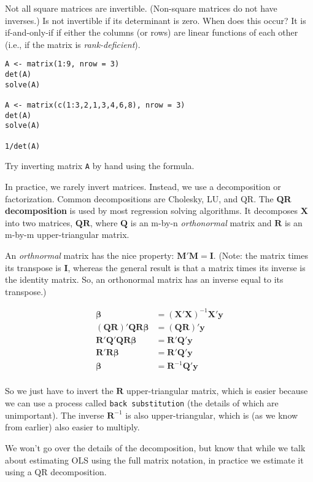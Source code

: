 \documentclass[a4paper,12pt]{article}
\newcommand{\matr}[1]{\mathbf{#1}}
\begin{document}
Not all square matrices are invertible. (Non-square matrices do not have inverses.) Is not invertible if its determinant is zero. When does this occur? It is if-and-only-if if either the columns (or rows) are linear functions of each other (i.e., if the matrix is \textit{rank-deficient}).


\begin{lstlisting}
A <- matrix(1:9, nrow = 3)
det(A)
solve(A)

A <- matrix(c(1:3,2,1,3,4,6,8), nrow = 3)
det(A)
solve(A)

1/det(A) 
\end{lstlisting}

Try inverting matrix \texttt{A} by hand using the formula.


In practice, we rarely invert matrices. Instead, we use a decomposition or factorization. Common decompositions are Cholesky, LU, and QR. The \textbf{QR decomposition} is used by most regression solving algorithms. It decomposes $\matr{X}$ into two matrices, $\matr{Q}\matr{R}$, where $\matr{Q}$ is an m-by-n \textit{orthonormal} matrix and $\matr{R}$ is an m-by-m upper-triangular matrix.

An \textit{orthnormal} matrix has the nice property: $\matr{M}'\matr{M} = \matr{I}$. (Note: the matrix times its transpose is $\matr{I}$, whereas the general result is that a matrix times its inverse is the identity matrix. So, an orthonormal matrix has an inverse equal to its transpose.)

\begin{align*}
\matr{\beta} & = (\matr{X}'\matr{X})^{-1}\matr{X}'\matr{y} \\
(\matr{Q}\matr{R})'\matr{Q}\matr{R}\matr{\beta} & = (\matr{Q}\matr{R})'\matr{y} \\
\matr{R}'\matr{Q}'\matr{Q}\matr{R}\matr{\beta} & = \matr{R}'\matr{Q}'\matr{y} \\
\matr{R}'\matr{R}\matr{\beta} & = \matr{R}'\matr{Q}'\matr{y} \\
\matr{\beta} & = \matr{R}^{-1}\matr{Q}'\matr{y}\\
\end{align*}

So we just have to invert the $\matr{R}$ upper-triangular matrix, which is easier because we can use a process called \texttt{back substitution} (the details of which are unimportant). The inverse $\matr{R}^{-1}$ is also upper-triangular, which is (as we know from earlier) also easier to multiply.

We won't go over the details of the decomposition, but know that while we talk about estimating OLS using the full matrix notation, in practice we estimate it using a QR decomposition.
\end{document}
